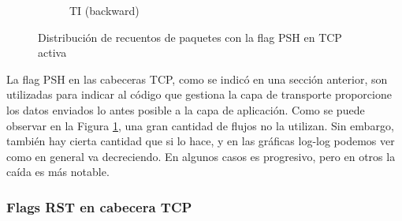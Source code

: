 \begin{figure}[H]
\begin{subfigure}[b]{0.26\textwidth}
        \caption{TI (backward)}
    \end{subfigure}
       \caption{Distribución de recuentos de paquetes con la flag PSH en TCP activa}
       \label{fig:packet_pincer_bidirectional_tcp_psh_flags_count}
\end{figure}

La flag PSH en las cabeceras TCP, como se indicó en una sección anterior, son utilizadas para indicar al código que gestiona la capa de transporte proporcione los datos enviados lo antes posible a la capa de aplicación. Como se puede observar en la Figura \ref{fig:packet_pincer_bidirectional_tcp_psh_flags_count}, una gran cantidad de flujos no la utilizan. Sin embargo, también hay cierta cantidad que si lo hace, y en las gráficas log-log podemos ver como en general va decreciendo. En algunos casos es progresivo, pero en otros la caída es más notable.

\subsubsection{Flags RST en cabecera TCP}

